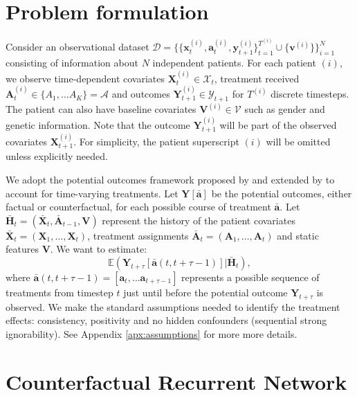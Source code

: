 \documentclass{article} %
\newcommand{\vc}[1]{\mathbf{#1}}
\newcommand{\cl}[1]{\mathcal{#1}}
\newcommand{\hist}[1]{\bar{\vc{#1}}}
\begin{document}
	\section{Problem formulation}
	
	Consider an observational dataset $\cl{D} = \big\{ \{\vc{x}^{(i)}_{t},  \vc{a}^{(i)}_{t}, \vc{y}_{t+1}^{(i)} \}_{t=1}^{T^{(i)}} \cup \{\vc{v}^{(i)} \}  \big\}_{i=1}^N$ consisting of information about $N$ independent patients. For each patient $(i)$, we observe time-dependent covariates $\vc{X}_t^{(i)} \in \cl{X}_t$, treatment received $\vc{A}^{(i)}_t \in \{A_1, \dots A_K\} = \cl{A}$ and outcomes $\vc{Y}^{(i)}_{t+1} \in \mathcal{Y}_{t+1}$ for $T^{(i)}$ discrete timesteps. The patient can also have baseline covariates $\vc{V}^{(i)} \in \cl{V}$ such as gender and genetic information. Note that the outcome $\vc{Y}^{(i)}_{t+1}$ will be part of the observed covariates $\vc{X}^{(i)}_{t+1}$. For simplicity, the patient superscript $(i)$ will be omitted unless explicitly needed. 

	
	We adopt the potential outcomes framework proposed by \citep{neyman1923applications, rubin1978bayesian} and extended by \citep{robins2008estimation} to account for time-varying treatments. Let $\mathbf{Y}[\hist{a}]$ be the potential outcomes, either factual or counterfactual, for each possible course of treatment $\hist{a}$. Let $\bar{\vc{H}}_{t} = (\bar{\vc{X}}_{t}, \bar{\vc{A}}_{t-1}, \vc{V}) $ represent the history of the patient covariates $\bar{\vc{X}}_{t} = (\vc{X}_{1}, \dots, \vc{X}_{t})$,  treatment assignments $\hist{{A}}_{t} = (\vc{A}_{1}, \dots, \vc{A}_t)$ and static features $\vc{V}$. We want to estimate:
	\begin{equation}
	\mathbb{E}(\vc{Y}_{t+\tau}[\hist{a}(t, t+\tau -1 )] | \bar{\vc{H}}_{t}),
	\end{equation} 
	where  $\hist{a}(t, t+\tau-1) = [\vc{a}_{t}, \dots \vc{a}_{{t+\tau -1 }}]$ represents a possible sequence of treatments from timestep $t$ just until before the potential outcome $\vc{Y}_{t+\tau}$ is observed. We make the standard assumptions \citep{robins2000marginal, lim2018forecasting} needed to identify the treatment effects: consistency, positivity and no hidden confounders (sequential strong ignorability). See Appendix \ref{apx:assumptions} for more more details.


		\section{Counterfactual Recurrent Network} \label{sec:crn}
		
\end{document}
